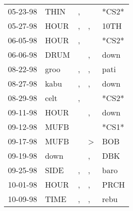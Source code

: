 \begin{supertabular}{p{0.07\textwidth}p{0.06\textwidth}p{0.02\textwidth}p{0.02\textwidth}p{0.06\textwidth}}
          05-23-98\textsuperscript{} &           THIN\textsuperscript{} &                , &                  &                            *CS2* \\
          05-27-98\textsuperscript{} &           HOUR\textsuperscript{} &                , &                , &           10TH\textsuperscript{} \\
          06-05-98\textsuperscript{} &           HOUR\textsuperscript{} &                , &                  &                            *CS2* \\
          06-06-98\textsuperscript{} &           DRUM\textsuperscript{} &                  &                , &           down\textsuperscript{} \\
          08-22-98\textsuperscript{} &           groo\textsuperscript{} &                , &                , &           pati\textsuperscript{} \\
          08-27-98\textsuperscript{} &           kabu\textsuperscript{} &                , &                , &           down\textsuperscript{} \\
          08-29-98\textsuperscript{} &           celt\textsuperscript{} &                , &                  &                            *CS2* \\
          09-11-98\textsuperscript{} &           HOUR\textsuperscript{} &                  &                , &           down\textsuperscript{} \\
          09-12-98\textsuperscript{} &           MUFB\textsuperscript{} &                  &                  &                            *CS1* \\
          09-17-98\textsuperscript{} &           MUFB\textsuperscript{} &                  &     \textgreater &            BOB\textsuperscript{} \\
          09-19-98\textsuperscript{} &           down\textsuperscript{} &                  &                , &            DBK\textsuperscript{} \\
          09-25-98\textsuperscript{} &           SIDE\textsuperscript{} &                , &                , &           baro\textsuperscript{} \\
          10-01-98\textsuperscript{} &           HOUR\textsuperscript{} &                , &                , &           PRCH\textsuperscript{} \\
          10-09-98\textsuperscript{} &           TIME\textsuperscript{} &                , &                , &           rebu\textsuperscript{} \\

\end{supertabular}
